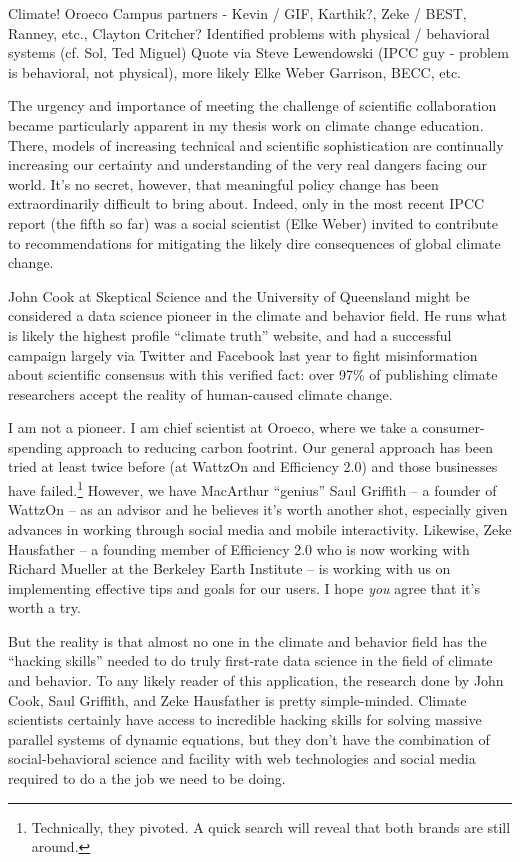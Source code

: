 Climate!
Oroeco
Campus partners - Kevin / GIF, Karthik?, Zeke / BEST, Ranney, etc., Clayton Critcher?
Identified problems with physical / behavioral systems (cf. Sol, Ted Miguel)
Quote via Steve Lewendowski (IPCC guy - problem is behavioral, not physical), more likely Elke Weber
Garrison, BECC, etc.

The urgency and importance of meeting the challenge of scientific collaboration
became particularly apparent in my thesis work on climate change education.
There, models of increasing technical and scientific sophistication are
continually increasing our certainty and understanding of the very real dangers
facing our world. It's no secret, however, that meaningful policy change has
been extraordinarily difficult to bring about. Indeed, only in the most recent
IPCC report (the fifth so far) was a social scientist (Elke Weber) invited to
contribute to recommendations for mitigating the likely dire consequences of
global climate change.

John Cook at Skeptical Science and the University of Queensland might be
considered a data science pioneer in the climate and behavior field. He runs
what is likely the highest profile “climate truth” website, and had a successful
campaign largely via Twitter and Facebook last year to fight misinformation
about scientific consensus with this verified fact: over 97\% of publishing
climate researchers accept the reality of human-caused climate change.

I am not a pioneer. I am chief scientist at Oroeco, where we take a
consumer-spending approach to reducing carbon footrint.  Our general approach
has been tried at least twice before (at WattzOn and Efficiency 2.0) and those
businesses have failed.\footnote{Technically, they pivoted. A quick search will
    reveal that both brands are still around.} However, we have MacArthur
“genius” Saul Griffith -- a founder of WattzOn -- as an advisor and he believes
it's worth another shot, especially given advances in working through social
media and mobile interactivity. Likewise, Zeke Hausfather -- a founding member
of Efficiency 2.0 who is now working with Richard Mueller at the Berkeley Earth
Institute -- is working with us on implementing effective tips and goals for our
users. I hope \emph{you} agree that it's worth a try.

But the reality is that almost no one in the climate and behavior field has the
“hacking skills” needed to do truly first-rate data science in the field of
climate and behavior. To any likely reader of this application, the research
done by John Cook, Saul Griffith, and Zeke Hausfather is pretty simple-minded.
Climate scientists certainly have access to incredible hacking skills for
solving massive parallel systems of dynamic equations, but they don't
have the combination of social-behavioral science and facility with
web technologies and social media required to do a the job we need to be doing.

